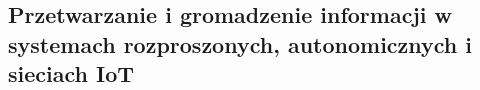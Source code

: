 \subsection{Przetwarzanie i gromadzenie informacji w systemach rozproszonych, autonomicznych i sieciach IoT}